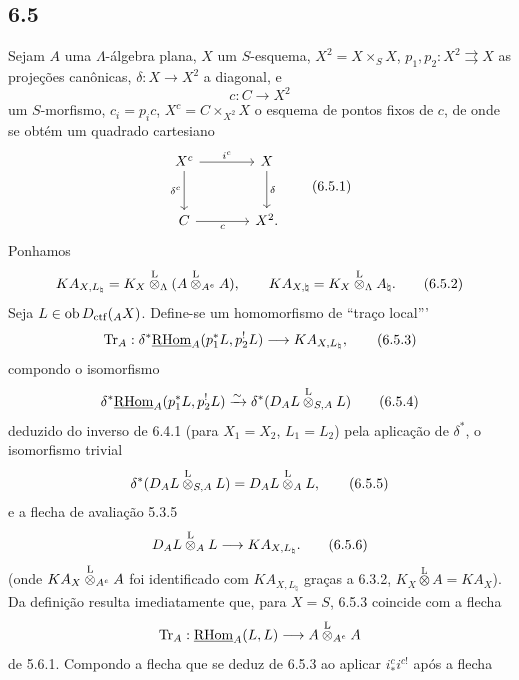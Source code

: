 \subsection*{6.5}
Sejam $A$ uma $\Lambda$-álgebra plana, $X$ um $S$-esquema, $X^2=X\times_SX$, $p_1,p_2:X^2\rightrightarrows X$ as projeções canônicas, $\delta:X\to X^2$ a diagonal, e
\[
c:C\longrightarrow X^2
\]
um $S$-morfismo, $c_i=p_ic$, $X^c=C\times_{X^2}X$ o esquema de pontos fixos de $c$, de onde se obtém um quadrado cartesiano
\begin{equation}
\begin{tikzcd}[column sep=large,row sep=large]
X^c \arrow[r,"i^c"] \arrow[d,"\delta^c"'] & X \arrow[d,"\delta"]\\
C \arrow[r,"c"'] & X^2 .
\end{tikzcd}
\tag{6.5.1}
\end{equation}
Ponhamos
\begin{equation}
KA_{X,L_{\natural}}=K_X\overset{\mathrm L}{\otimes}_{\Lambda}(A\overset{\mathrm L}{\otimes}_{A^e}A),
\qquad
KA_{X,\natural}=K_X\overset{\mathrm L}{\otimes}_{\Lambda}A_{\natural}.
\tag{6.5.2}
\end{equation}
Seja $L\in\operatorname{ob} D_{\mathrm{ctf}}({}_AX)$. Define-se um homomorfismo de ``traço local'''
\begin{equation}
\operatorname{Tr}_A:\delta^*\underline{\mathrm{RHom}}_A(p_1^*L,p_2^!L)
\longrightarrow
KA_{X,L_{\natural}},
\tag{6.5.3}
\end{equation}
compondo o isomorfismo
\begin{equation}
\delta^*\underline{\mathrm{RHom}}_A(p_1^*L,p_2^!L)
\xrightarrow{\sim}
\delta^*(D_AL\overset{\mathrm L}{\otimes}_{S,A}L)
\tag{6.5.4}
\end{equation}
deduzido do inverso de 6.4.1 (para $X_1=X_2$, $L_1=L_2$) pela aplicação de $\delta^*$, o isomorfismo trivial
\begin{equation}
\delta^*(D_AL\overset{\mathrm L}{\otimes}_{S,A}L)=D_AL\overset{\mathrm L}{\otimes}_AL,
\tag{6.5.5}
\end{equation}
e a flecha de avaliação 5.3.5
\begin{equation}
D_AL\overset{\mathrm L}{\otimes}_AL\longrightarrow KA_{X,L_{\natural}}.
\tag{6.5.6}
\end{equation}
(onde $KA_X\overset{\mathrm L}{\otimes}_{A^e}A$ foi identificado com $KA_{X,L_{\natural}}$ graças a 6.3.2, $K_X\overset{\mathrm L}{\otimes}A=KA_X$). Da definição resulta imediatamente que, para $X=S$, 6.5.3 coincide com a flecha
\[
\operatorname{Tr}_A:\underline{\mathrm{RHom}}_A(L,L)\longrightarrow A\overset{\mathrm L}{\otimes}_{A^e}A
\]
de 5.6.1. Compondo a flecha que se deduz de 6.5.3 ao aplicar $i_*^ci^{c!}$ após a flecha
